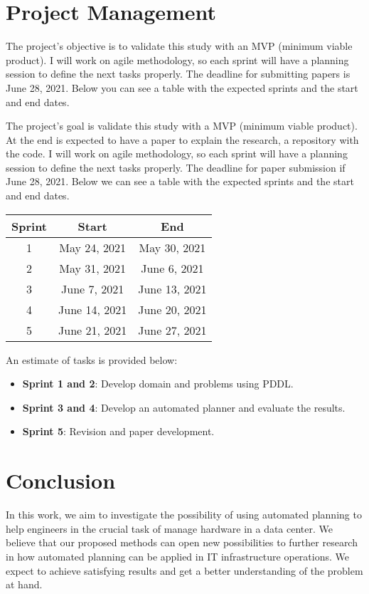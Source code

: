 \documentclass[letterpaper]{article}
\begin{document}
\section{Project Management}

The project's objective is to validate this study with an MVP (minimum viable product). I will work on agile methodology, so each sprint will have a planning session to define the next tasks properly. The deadline for submitting papers is June 28, 2021. Below you can see a table with the expected sprints and the start and end dates.

The project's goal is validate this study with a MVP (minimum viable product). At the end is expected to have a paper to explain the research, a repository with the code. I will work on agile methodology, so each sprint will have a planning session to define the next tasks properly. The deadline for paper submission if June 28, 2021. Below we can see a table with the expected sprints and the start and end dates.

\begin{center}
 \begin{tabular}{||c|c|c||} 
 \hline
 Sprint & Start & End \\
 \hline
 1 & May 24, 2021 & May 30, 2021 \\ 
 \hline
 2 & May 31, 2021 & June 6, 2021 \\
 \hline
 3 & June 7, 2021 & June 13, 2021 \\
 \hline
 4 & June 14, 2021 & June 20, 2021 \\
 \hline
 5 & June 21, 2021 & June 27, 2021 \\ [1ex] 
 \hline
\end{tabular}
\end{center}

An estimate of tasks is provided below:

\begin{itemize}
    \item \textbf{Sprint 1 and 2}: Develop domain and problems using PDDL.
    \item \textbf{Sprint 3 and 4}: Develop an automated planner and evaluate the results.
    \item \textbf{Sprint 5}: Revision and paper development.
\end{itemize}

\section{Conclusion}
In this work, we aim to investigate the possibility of using automated planning to help engineers in the crucial task of manage hardware in a data center. We believe that our proposed methods can open new possibilities to further research in how automated planning can be applied in IT infrastructure operations. We expect to achieve satisfying results and get a better understanding of the problem at hand.
\end{document}
